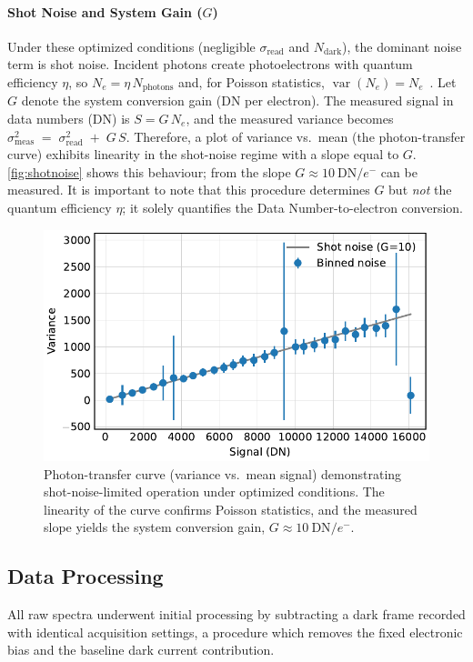 \documentclass[
	a4paper,
]{scrarticle}
\begin{document}
\paragraph{Shot Noise and System Gain ($G$)}
Under these optimized conditions (negligible $\sigma_{\text{read}}$ and $N_{\text{dark}}$), the dominant noise term is shot noise.
Incident photons create photoelectrons with quantum efficiency \(\eta\), so \(N_e=\eta\,N_{\text{photons}}\) and, for Poisson statistics, \(\operatorname{var}(N_e)=N_e\)~\cite{europeanmachinevisionassociationStandardCharacterizationImage2010}.
Let \(G\) denote the system conversion gain (DN per electron). The measured signal in data numbers (DN) is \(S = G\,N_e\), and the measured variance becomes \(\sigma^2_{\text{meas}} \;=\; \sigma_{\text{read}}^2 \;+\; G\,S\).
Therefore, a plot of variance vs.\ mean (the photon-transfer curve) exhibits linearity in the shot-noise regime with a slope equal to $G$.
\autoref{fig:shotnoise} shows this behaviour; from the slope \(G \approx 10~\text{DN}/e^{-}\) can be measured.
It is important to note that this procedure determines $G$ but \emph{not} the quantum efficiency $\eta$; it solely quantifies the Data Number-to-electron conversion.

\begin{figure}[h]
    \centering
    \includegraphics{../analysis/figures/shot noise.pdf}
    \caption{Photon-transfer curve (variance vs.\ mean signal) demonstrating shot-noise-limited operation under optimized conditions. The linearity of the curve confirms Poisson statistics, and the measured slope yields the system conversion gain, $G \approx 10~\text{DN}/e^{-}$.}
    \label{fig:shotnoise}
\end{figure}

\subsection{Data Processing}
All raw spectra underwent initial processing by subtracting a dark frame recorded with identical acquisition settings, a procedure which removes the fixed electronic bias and the baseline dark current contribution.
\end{document}
